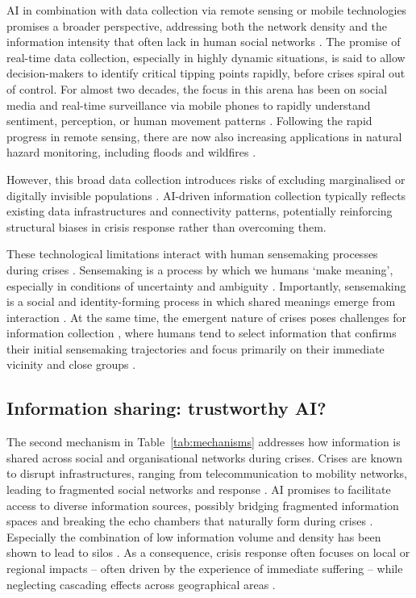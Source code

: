 \documentclass[pdflatex,sn-basic]{sn-jnl}
\begin{document}
AI in combination with data collection via remote sensing or mobile technologies promises a broader perspective, addressing both the network density and the information intensity that often lack in human social networks \citep{pan2012crisis}.
The promise of real-time data collection, especially in highly dynamic situations, is said to allow decision-makers to identify critical tipping points rapidly, before crises spiral out of control. For almost two decades, the focus in this arena has been on social media and real-time surveillance via mobile phones to rapidly understand sentiment, perception, or human movement patterns \citep{mai2025evaluating,middleton2013real,qadir2016crisis}. Following the rapid progress in remote sensing, there are now also increasing applications in natural hazard monitoring, including floods \citep{zhou2024threshold} and wildfires \citep{roy2024multi}.

However, this broad data collection introduces risks of excluding marginalised or digitally invisible populations \citep{coleman2024weaving}. AI-driven information collection typically reflects existing data infrastructures and connectivity patterns, potentially reinforcing structural biases in crisis response rather than overcoming them.

These technological limitations interact with human sensemaking processes during crises \citep{klein2010rapid}. Sensemaking is a process by which we humans `make meaning', especially in conditions of uncertainty and ambiguity \citep{weick2005organizing}. Importantly, sensemaking is a social and identity-forming process in which shared meanings emerge from interaction \citep{maitlis2010sensemaking}. At the same time, the emergent nature of crises poses challenges for information collection \citep{turoff2004design}, where humans tend to select information that confirms their initial sensemaking trajectories \citep{barbera2015tweeting} and focus primarily on their immediate vicinity and close groups \citep{comes2020coordination}.

\subsection{Information sharing: trustworthy AI?}\label{sec:sharing}

The second mechanism in Table~\ref{tab:mechanisms} addresses how information is shared across social and organisational networks during crises. Crises are known to disrupt infrastructures, ranging from telecommunication to mobility networks, leading to fragmented social networks and response \citep{holguin2012unique}.
AI promises to facilitate access to diverse information sources, possibly bridging fragmented information spaces and breaking the echo chambers that naturally form during crises \citep{jeon2024hearhere}. Especially the combination of low information volume and density has been shown to lead to silos \citep{pan2012crisis}. As a consequence, crisis response often focuses on local or regional impacts -- often driven by the experience of immediate suffering -- while neglecting cascading effects across geographical areas \citep{sigala2022mitigating,wolbers2018introducing}.
\end{document}
